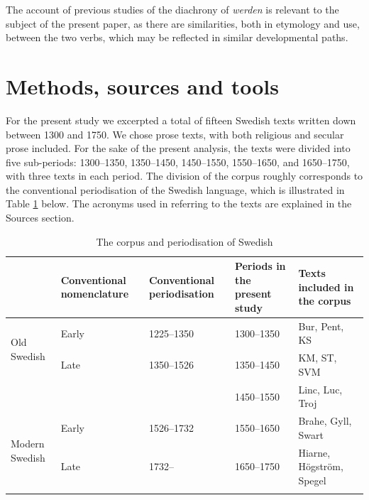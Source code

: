 \documentclass[output=paper,colorlinks,citecolor=brown]{langscibook}
\begin{document}
The account of previous studies of the diachrony of \textit{werden} is relevant to the subject of the present paper, as there are similarities, both in etymology and use, between the two verbs, which may be reflected in similar developmental paths.

\section{Methods, sources and tools} \label{sec:skrzypek:3}

For the present study we excerpted a total of fifteen Swedish texts written down between 1300 and 1750. We chose prose texts, with both religious and secular prose included. For the sake of the present analysis, the texts were divided into five sub-periods: 1300--1350, 1350--1450, 1450--1550, 1550--1650, and 1650--1750, with three texts in each period. The division of the corpus roughly corresponds to the conventional periodisation of the Swedish language, which is illustrated in Table \ref{tab:skrzypek:1} below. The acronyms used in referring to the texts are explained in the Sources section.

\begin{table}
\caption{The corpus and periodisation of Swedish}
\label{tab:skrzypek:1}
\scriptsize
\begin{tabularx}{\textwidth}{X X X X p{3cm}}
  \lsptoprule
  & {Conventional nomenclature} & {Conventional periodisation} & {Periods in the present study} & {Texts included in the corpus} \\
  \midrule
  \multirow{2}{*}{Old Swedish} & Early & 1225–1350 & 1300–1350 & Bur, Pent, KS \\
                               & Late  & 1350–1526 & 1350–1450 & KM, ST, SVM \\
                               &       &           & 1450–1550 & Linc, Luc, Troj \\
  \midrule
  \multirow{2}{*}{Modern Swedish} & Early & 1526–1732 & 1550–1650 & Brahe, Gyll, Swart \\
                                  & Late  & 1732–     & 1650–1750 & Hiarne, Högström, Spegel \\
  \lspbottomrule
\end{tabularx}
\end{table}
\end{document}
